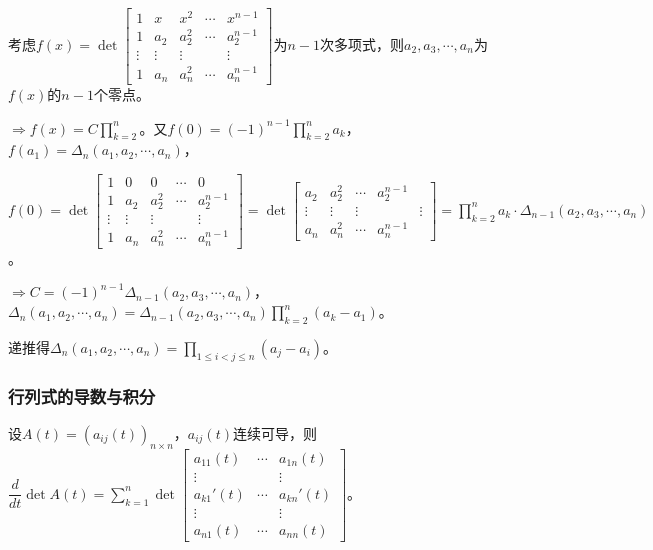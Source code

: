                 \begin{solution}
                    考虑$f(x)=\det\begin{bmatrix}1&x&x^2&\cdots&x^{n-1}\\1&a_2&a_2^2&\cdots&a_2^{n-1}\\\vdots&\vdots&\vdots&&\vdots\\1&a_n&a_n^2&\cdots&a_n^{n-1}\end{bmatrix}$为$n-1$次多项式，则$a_2,a_3,\cdots,a_n$为$f(x)$的$n-1$个零点。

                    $\Rightarrow f(x)=C\prod\limits_{k=2}^{n}$。又$f(0)=(-1)^{n-1}\prod\limits_{k=2}^n a_k$，$f(a_1)=\Delta_n(a_1,a_2,\cdots,a_n)$，

                    $f(0)=\det\begin{bmatrix}1&0&0&\cdots&0\\1&a_2&a_2^2&\cdots&a_2^{n-1}\\\vdots&\vdots&\vdots&&\vdots\\1&a_n&a_n^2&\cdots&a_n^{n-1}\end{bmatrix}=\det\begin{bmatrix}a_2&a_2^2&\cdots&a_2^{n-1}\\\vdots&\vdots&\vdots&&\vdots\\a_n&a_n^2&\cdots&a_n^{n-1}\end{bmatrix}=\prod\limits_{k=2}^n a_k\cdot\Delta_{n-1}(a_2,a_3,\cdots,a_n)$。

                    $\Rightarrow C=(-1)^{n-1}\Delta_{n-1}(a_2,a_3,\cdots,a_n)$，$\Delta_n(a_1,a_2,\cdots,a_n)=\Delta_{n-1}(a_2,a_3,\cdots,a_n)\prod\limits_{k=2}^n(a_k-a_1)$。

                    递推得$\Delta_n(a_1,a_2,\cdots,a_n)=\prod\limits_{1\leq i<j\leq n}(a_j-a_i)$。
                \end{solution}

            \subsubsection{行列式的导数与积分}

                \begin{proposition}
                    \label{determinant_derivative}
                    设$A(t)=(a_{ij}(t))_{n\times n}$，$a_{ij}(t)$连续可导，则$\dfrac{d}{dt}\det A(t)=\sum\limits_{k=1}^{n}\det\begin{bmatrix}a_{11}(t)&\cdots&a_{1n}(t)\\\vdots&&\vdots\\a_{k1}'(t)&\cdots&a_{kn}'(t)\\\vdots&&\vdots\\a_{n1}(t)&\cdots&a_{nn}(t)\end{bmatrix}$。
                \end{proposition}

